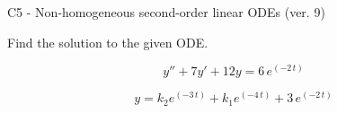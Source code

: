 \begin{exercise}
  \begin{exerciseTitle}C5 - Non-homogeneous second-order linear ODEs (ver. 9)\end{exerciseTitle}
  \begin{exerciseStatement}
    
Find the solution to the given ODE.

    
\[y''+7y'+12y = 6 \, e^{\left(-2 \, t\right)}\]

  \end{exerciseStatement}
  \begin{exerciseAnswer}
    
\[y= k_{2} e^{\left(-3 \, t\right)} + k_{1} e^{\left(-4 \, t\right)} + 3 \, e^{\left(-2 \, t\right)}\]

  \end{exerciseAnswer}
\end{exercise}
